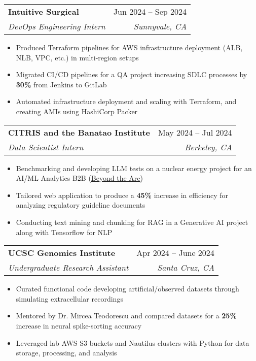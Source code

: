 \documentclass[letterpaper,11pt]{article}
\makeatletter
\newcommand{\resumeItem}[1]{
  \item\small{
    {#1 \vspace{-2pt}}
  }
}
\newcommand{\resumeSubheading}[4]{
  \vspace{-2pt}\item
    \begin{tabular*}{0.97\textwidth}[t]{l@{\extracolsep{\fill}}r}
      \textbf{#1} & #2 \\
      \textit{\small#3} & \textit{\small #4} \\
    \end{tabular*}\vspace{-7pt}
}
\newcommand{\resumeItemListStart}{\begin{itemize}}
\newcommand{\resumeItemListEnd}{\end{itemize}\vspace{-5pt}}
\makeatother
\begin{document}
\resumeSubheading
{Intuitive Surgical}{Jun 2024 -- Sep 2024}
{DevOps Engineering Intern}{Sunnyvale, CA}
\resumeItemListStart
\resumeItem{Produced Terraform pipelines for AWS infrastructure deployment (ALB, NLB, VPC, etc.) in multi-region setups}
\resumeItem{Migrated CI/CD pipelines for a QA project increasing SDLC processes by \textbf{30\%} from Jenkins to GitLab}
\resumeItem{Automated infrastructure deployment and scaling with Terraform, and creating AMIs using HashiCorp Packer}
\resumeItemListEnd

\resumeSubheading
{CITRIS and the Banatao Institute}{May 2024 -- Jul 2024}
{Data Scientist Intern}{Berkeley, CA}
\resumeItemListStart
\resumeItem{Benchmarking and developing LLM tests on a nuclear energy project for an AI/ML Analytics B2B (\color[HTML]{0000EE}\href{https://beyondthearc.com}{Beyond the Arc})}
\resumeItem{Tailored web application to produce a \textbf{45\%} increase in efficiency for analyzing regulatory guideline documents}
\resumeItem{Conducting text mining and chunking for RAG in a Generative AI project along with Tensorflow for NLP}
\resumeItemListEnd

\resumeSubheading
{UCSC Genomics Institute}{Apr 2024 -- June 2024}
{Undergraduate Research Assistant}{Santa Cruz, CA}
\resumeItemListStart
\resumeItem{Curated functional code developing artificial/observed datasets through simulating extracellular recordings}
\resumeItem{Mentored by Dr. Mircea Teodorescu and compared datasets for a {\textbf{25\%}} increase in neural spike-sorting accuracy}
\resumeItem{Leveraged lab AWS S3 buckets and Nautilus clusters with Python for data storage, processing, and analysis}
\resumeItemListEnd


\end{document}
